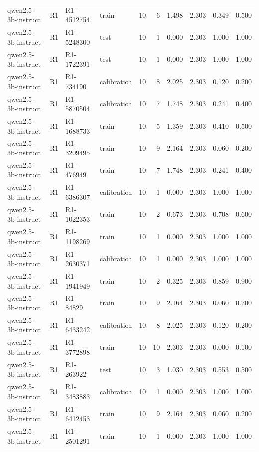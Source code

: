 \begin{table}
\begin{tabular}{llllrrrrrr}
qwen2.5-3b-instruct & R1 & R1-4512754 & train & 10 & 6 & 1.498 & 2.303 & 0.349 & 0.500 \\
qwen2.5-3b-instruct & R1 & R1-5248300 & test & 10 & 1 & 0.000 & 2.303 & 1.000 & 1.000 \\
qwen2.5-3b-instruct & R1 & R1-1722391 & test & 10 & 1 & 0.000 & 2.303 & 1.000 & 1.000 \\
qwen2.5-3b-instruct & R1 & R1-734190 & calibration & 10 & 8 & 2.025 & 2.303 & 0.120 & 0.200 \\
qwen2.5-3b-instruct & R1 & R1-5870504 & calibration & 10 & 7 & 1.748 & 2.303 & 0.241 & 0.400 \\
qwen2.5-3b-instruct & R1 & R1-1688733 & train & 10 & 5 & 1.359 & 2.303 & 0.410 & 0.500 \\
qwen2.5-3b-instruct & R1 & R1-3209495 & train & 10 & 9 & 2.164 & 2.303 & 0.060 & 0.200 \\
qwen2.5-3b-instruct & R1 & R1-476949 & train & 10 & 7 & 1.748 & 2.303 & 0.241 & 0.400 \\
qwen2.5-3b-instruct & R1 & R1-6386307 & calibration & 10 & 1 & 0.000 & 2.303 & 1.000 & 1.000 \\
qwen2.5-3b-instruct & R1 & R1-1022353 & train & 10 & 2 & 0.673 & 2.303 & 0.708 & 0.600 \\
qwen2.5-3b-instruct & R1 & R1-1198269 & train & 10 & 1 & 0.000 & 2.303 & 1.000 & 1.000 \\
qwen2.5-3b-instruct & R1 & R1-2630371 & calibration & 10 & 1 & 0.000 & 2.303 & 1.000 & 1.000 \\
qwen2.5-3b-instruct & R1 & R1-1941949 & train & 10 & 2 & 0.325 & 2.303 & 0.859 & 0.900 \\
qwen2.5-3b-instruct & R1 & R1-84829 & train & 10 & 9 & 2.164 & 2.303 & 0.060 & 0.200 \\
qwen2.5-3b-instruct & R1 & R1-6433242 & calibration & 10 & 8 & 2.025 & 2.303 & 0.120 & 0.200 \\
qwen2.5-3b-instruct & R1 & R1-3772898 & train & 10 & 10 & 2.303 & 2.303 & 0.000 & 0.100 \\
qwen2.5-3b-instruct & R1 & R1-263922 & test & 10 & 3 & 1.030 & 2.303 & 0.553 & 0.500 \\
qwen2.5-3b-instruct & R1 & R1-3483883 & calibration & 10 & 1 & 0.000 & 2.303 & 1.000 & 1.000 \\
qwen2.5-3b-instruct & R1 & R1-6412453 & train & 10 & 9 & 2.164 & 2.303 & 0.060 & 0.200 \\
qwen2.5-3b-instruct & R1 & R1-2501291 & train & 10 & 1 & 0.000 & 2.303 & 1.000 & 1.000 \\

\end{tabular}
\end{table}
